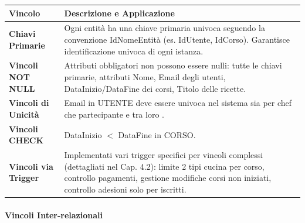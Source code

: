 \begin{center}
\begin{tcolorbox}[colback=white!98!gray, colframe=myblue!80!black, title=Vincoli Intra-relazionali, arc=4mm, boxrule=0.8pt, width=0.98\textwidth]
\renewcommand{\arraystretch}{1.2}
\begin{tabularx}{\textwidth}{p{4cm}X}
\textbf{Vincolo} & \textbf{Descrizione e Applicazione} \\
\hline
\textbf{Chiavi Primarie} & Ogni entità ha una chiave primaria univoca seguendo la convenzione IdNomeEntità (es. IdUtente, IdCorso). Garantisce identificazione univoca di ogni istanza. \\
\hline
\textbf{Vincoli NOT NULL} & Attributi obbligatori non possono essere nulli: tutte le chiavi primarie, attributi Nome, Email degli utenti, DataInizio/DataFine dei corsi, Titolo delle ricette. \\
\hline
\textbf{Vincoli di Unicità} & Email in UTENTE deve essere univoca nel sistema sia per chef che partecipante e tra loro . \\
\hline
\textbf{Vincoli CHECK} & DataInizio $<$ DataFine in CORSO. \\
\hline
\textbf{Vincoli via Trigger} & Implementati vari trigger specifici per vincoli complessi (dettagliati nel Cap. 4.2): limite 2 tipi cucina per corso, controllo pagamenti, gestione modifiche corsi non iniziati, controllo adesioni solo per iscritti. \\
\hline
\end{tabularx}
\end{tcolorbox}
\end{center}

\paragraph{Vincoli Inter-relazionali}

